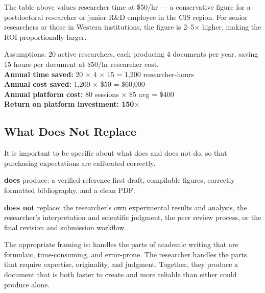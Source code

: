The table above values researcher time at \$50/hr — a conservative figure for a
postdoctoral researcher or junior R\&D employee in the CIS region.
For senior researchers or those in Western institutions, the figure is 2--5$\times$ higher,
making the ROI proportionally larger.

\begin{statbox}[title=Break-Even Analysis for a University Department]
Assumptions: 20 active researchers, each producing 4 documents per year,
saving 15 hours per document at \$50/hr researcher cost.\\[0.4em]
\textbf{Annual time saved:} 20 × 4 × 15 = 1,200 researcher-hours\\
\textbf{Annual cost saved:} 1,200 × \$50 = \$60,000\\
\textbf{Annual platform cost:} 80 sessions × \$5 avg = \$400\\[0.4em]
\textbf{Return on platform investment: 150$\times$}
\end{statbox}

\subsection{What \sys{} Does Not Replace}

It is important to be specific about what \sys{} does and does not do, so that
purchasing expectations are calibrated correctly.

\sys{} \textbf{does} produce:
a verified-reference first draft, compilable figures, correctly formatted bibliography,
and a clean PDF.

\sys{} \textbf{does not} replace:
the researcher's own experimental results and analysis,
the researcher's interpretation and scientific judgment,
the peer review process,
or the final revision and submission workflow.

The appropriate framing is: \sys{} handles the parts of academic writing that are
formulaic, time-consuming, and error-prone.
The researcher handles the parts that require expertise, originality, and judgment.
Together, they produce a document that is both faster to create and more reliable
than either could produce alone.


